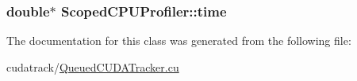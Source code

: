 \subsubsection[{\texorpdfstring{time}{time}}]{\setlength{\rightskip}{0pt plus 5cm}double$\ast$ Scoped\+C\+P\+U\+Profiler\+::time\hspace{0.3cm}{\ttfamily [private]}}\hypertarget{class_scoped_c_p_u_profiler_a36bc384b645ebc7dfbe14ae90ad12c0a}{}\label{class_scoped_c_p_u_profiler_a36bc384b645ebc7dfbe14ae90ad12c0a}


The documentation for this class was generated from the following file\+:\begin{DoxyCompactItemize}
\item 
cudatrack/\hyperlink{_queued_c_u_d_a_tracker_8cu}{Queued\+C\+U\+D\+A\+Tracker.\+cu}\end{DoxyCompactItemize}
